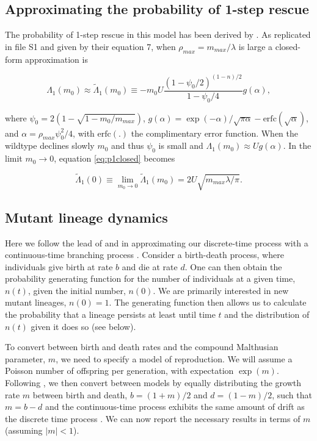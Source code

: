 \documentclass[9pt,twocolumn,twoside,lineno]{gsajnl}
\begin{document}
\subsection{Approximating the probability of 1-step rescue}

The probability of 1-step rescue in this model has been derived by \cite{Anciaux2018}.
As replicated in file S1 and given by their equation 7, when $\rho_{max} = m_{max}/\lambda$ is large a closed-form approximation is

\begin{equation}\label{eq:p1closed}
\Lambda_1(m_0) \approx \tilde{\Lambda}_1(m_0) \equiv  -m_0 U \frac{(1-\psi_0/2)^{(1-n)/2}}{1-\psi_0/4} g(\alpha),
\end{equation}

\noindent where $\psi_0 = 2(1-\sqrt{1-m_0/m_{max}})$, $g(\alpha) = \exp(-\alpha)/\sqrt{\pi \alpha} - \mathrm{erfc}(\sqrt{\alpha})$, and $\alpha=\rho_{max} \psi_0^2/4$, with $\mathrm{erfc}(.)$ the complimentary error function.
When the wildtype declines slowly $m_0$ and thus $\psi_0$ is small and $\Lambda_1(m_0)\approx U g(\alpha)$.
In the limit $m_0\rightarrow0$, equation \ref{eq:p1closed} becomes

\begin{equation}\label{eq:Lambda0}
\tilde{\Lambda}_1(0) \equiv \lim_{m_0\rightarrow0} \tilde{\Lambda}_1(m_0) = 2 U \sqrt{m_{max}\lambda/\pi}.
\end{equation} 

\subsection{Mutant lineage dynamics}
\label{subsec:mutants}

Here we follow the lead of \cite{Weissman2010} and \cite{Uecker2016} in approximating our discrete-time process with a continuous-time branching process \citep[see chapter 6 in][]{Allen2010}. 
Consider a birth-death process, where individuals give birth at rate $b$ and die at rate $d$. 
One can then obtain the probability generating function for the number of individuals at a given time, $n(t)$, given the initial number, $n(0)$.
We are primarily interested in new mutant lineages, $n(0)=1$.
The generating function then allows us to calculate the probability that a lineage persists at least until time $t$ and the distribution of $n(t)$ given it does so (see below).

To convert between birth and death rates and the compound Malthusian parameter, $m$, we need to specify a model of reproduction. 
We will assume a Poisson number of offspring per generation, with expectation $\exp(m)$.
Following \cite{Uecker2016}, we then convert between models by equally distributing the growth rate $m$ between birth and death, $b = (1+m)/2$ and $d=(1-m)/2$, such that $m=b-d$ and the continuous-time process exhibits the same amount of drift as the discrete time process \citep[and matches discrete-time simulations well;][]{Uecker2014}.
We can now report the necessary results in terms of $m$ (assuming $|m|<1$).
\end{document}
